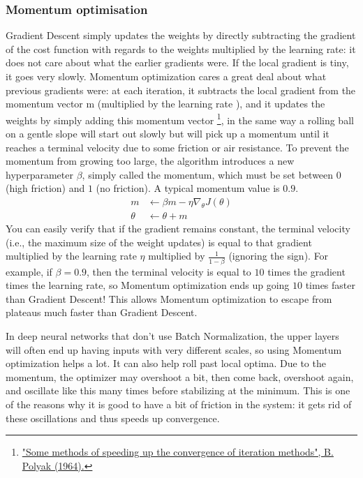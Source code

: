 \documentclass[12pt, letterpaper]{article}
\theoremstyle{definition}
\begin{document}
\subsubsection{Momentum optimisation}
Gradient Descent simply updates the weights by directly subtracting the gradient of the cost function  with regards to the weights multiplied by the learning rate: it does not care about what the earlier gradients were. If the local gradient is tiny, it goes very slowly. Momentum optimization cares a great deal about what previous gradients were: at each iteration, it subtracts the local gradient from the momentum vector m (multiplied by the learning rate ), and it updates the weights by simply adding this momentum vector \footnote{\href{https://homl.info/54}{"Some methods of speeding up the convergence of iteration methods", B. Polyak (1964).}}, in the same way a rolling ball on a gentle slope will start out slowly but will pick up a momentum until it reaches a terminal velocity due to some friction or air resistance. To prevent the momentum from growing too large, the algorithm introduces a new hyperparameter $\beta$, simply called the momentum, which must be set between $0$ (high friction) and $1$ (no friction). A typical momentum value is $0.9$.
\begin{equation}
\begin{aligned}
m &\leftarrow \beta m - \eta \nabla_\theta J(\theta)\\
\theta &\leftarrow \theta + m
\end{aligned}
\end{equation}
You can easily verify that if the gradient remains constant, the terminal velocity (i.e., the maximum size of the weight updates) is equal to that gradient multiplied by the learning rate $\eta$ multiplied by $\frac{1}{1-\beta}$ (ignoring the sign). For example, if $\beta = 0.9$, then the terminal velocity is equal to $10$ times the gradient times the learning rate, so Momentum optimization ends up going $10$ times faster than Gradient Descent! This allows Momentum optimization to escape from plateaus much faster than Gradient Descent.

In deep neural networks that don't use Batch Normalization, the upper layers will often end up having inputs with very different scales, so using Momentum optimization helps a lot. It can also help roll past local optima. Due to the momentum, the optimizer may overshoot a bit, then come back, overshoot again, and oscillate like this many times before stabilizing at the minimum. This is one of the reasons why it is good to have a bit of friction in the system: it gets rid of these oscillations and thus speeds up convergence. 
\end{document}
